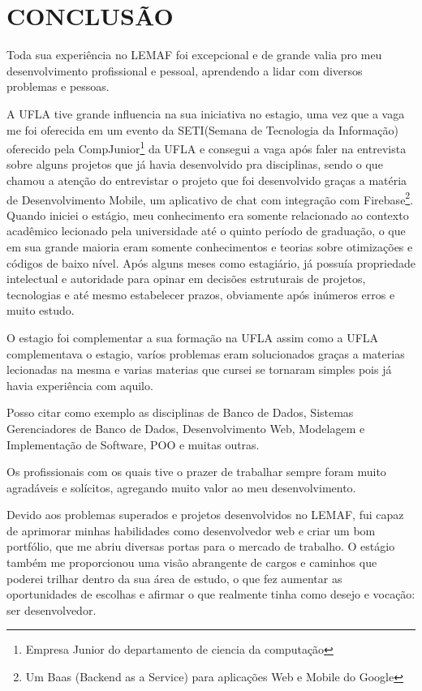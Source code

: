 \chapter{CONCLUSÃO}
\label{cap:conclusao}

Toda sua experiência no LEMAF foi excepcional e de grande valia pro meu desenvolvimento profissional e pessoal, aprendendo a lidar com diversos problemas e pessoas.

A UFLA tive grande influencia na sua iniciativa no estagio, uma vez que a vaga me foi oferecida em um evento da SETI(Semana de Tecnologia da Informação) oferecido pela CompJunior\footnote{Empresa Junior do departamento de ciencia da computação} da UFLA e consegui a vaga após faler na entrevista sobre alguns projetos que já havia desenvolvido pra disciplinas,
 sendo o que chamou a atenção do entrevistar o projeto que foi desenvolvido graças a matéria de Desenvolvimento Mobile, um aplicativo de chat com integração com Firebase\footnote{Um Baas (Backend as a Service) para aplicações Web e Mobile do Google}.
Quando iniciei o estágio, meu conhecimento era somente relacionado ao contexto acadêmico lecionado pela universidade até o quinto período de graduação, o que em sua grande maioria eram somente conhecimentos e teorias sobre otimizações e códigos de baixo nível.
Após alguns meses como estagiário, já possuía propriedade intelectual e autoridade para opinar em decisões estruturais de projetos, tecnologias e até mesmo estabelecer prazos, obviamente após inúmeros erros e muito estudo.
 
O estagio foi complementar a sua formação na UFLA assim como a UFLA complementava o estagio, varíos problemas eram solucionados graças a materias lecionadas na mesma e varias materias que cursei se tornaram simples pois já havia experiência com aquilo.

Posso citar como exemplo as disciplinas de Banco de Dados, Sistemas Gerenciadores de Banco de Dados, Desenvolvimento Web, Modelagem e Implementação de Software, POO e muitas outras.

Os profissionais com os quais tive o prazer de trabalhar sempre foram muito agradáveis e solícitos, agregando muito valor ao meu desenvolvimento.

Devido aos problemas superados e projetos desenvolvidos no LEMAF, fui capaz de aprimorar minhas habilidades como desenvolvedor web e criar um bom portfólio, que me abriu diversas portas para o mercado de trabalho.
O estágio também me proporcionou uma visão abrangente de cargos e caminhos que poderei trilhar dentro da sua área de estudo, o que fez aumentar as oportunidades de escolhas e afirmar o que realmente tinha como desejo e vocação: ser desenvolvedor.

